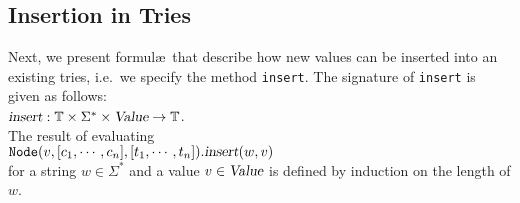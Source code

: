 \subsection{Insertion in Tries}
Next, we present formul\ae\ that describe how new values can be inserted into an existing tries,
i.e.~we specify the method \texttt{insert}.  The signature of \texttt{insert} is given as follows:
\\[0.2cm]
\hspace*{1.3cm}
$\textsl{insert}: \mathbb{T} \times \Sigma^* \times \textsl{Value} \rightarrow \mathbb{T}$.
\\[0.2cm]
The result of evaluating \\[0.2cm]
\hspace*{1.3cm} 
$\texttt{Node}(v, [c_1, \cdots, c_n], [t_1, \cdots, t_n]).\textsl{insert}(w,v)$
\\[0.2cm]
for a string $w\in \Sigma^*$ and a value $v \in \textsl{Value}$ is defined by induction on the
length of $w$.
